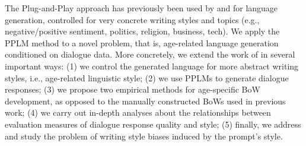 The Plug-and-Play approach has previously been used by \cite{dathathri2019plug} and \cite{madotto-etal-2020-plug} for language generation, controlled for very concrete writing styles and topics (e.g., negative/positive sentiment, politics, religion, business, tech). We apply the PPLM method to a novel problem, that is, age-related language generation conditioned on dialogue data. More concretely, we extend the work of \cite{dathathri2019plug} in several important ways: (1) we control the generated language for more abstract writing styles, i.e., age-related linguistic style; (2) we use PPLMs to generate dialogue responses; (3) we propose two empirical methods for age-specific BoW development, as opposed to the manually constructed BoWs used in previous work; (4) we carry out in-depth analyses about the relationships between evaluation measures of dialogue response quality and style; (5) finally, we address and study the problem of writing style biases induced by the prompt's style.



